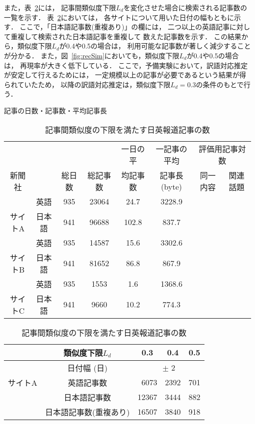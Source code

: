 また，表~\ref{tab:acq_art}には，
記事間類似度下限$L_d$を変化させた場合に検索される記事数の一覧を示す．
表~\ref{tab:acq_art}においては，
各サイトについて用いた日付の幅もともに示す．
ここで，「日本語記事数(重複あり)」の欄には，
二つ以上の英語記事に対して重複して検索された日本語記事を重複して
数えた記事数を示す．
この結果から，類似度下限$L_d$が0.4や0.5の場合は，
利用可能な記事数が著しく減少することが分かる．
また，図~\ref{fig:recSim}においても，類似度下限$L_d$が0.4や0.5の場合は，
再現率が大きく低下している．
ここで，予備実験において，訳語対応推定が安定して行えるためには，
一定規模以上の記事が必要であるという結果が得られていたため，
以降の訳語対応推定は，類似度下限$L_d=0.3$の条件のもとで行う．

\begin{table}
\begin{center}
 \caption{記事の日数・記事数・平均記事長}
 \label{tab:01}
  \newcommand{\lw}[1]{}
{
  \begin{tabular}{|c|c||c|c|c|c|c|c|}
   \hline
          &   &        &          & 一日の平 & 一記事の平均 
             &  \multicolumn{2}{|c|}{評価用記事対数} \\ \cline{7-8}
   新聞社 &   & 総日数 & 総記事数 & 均記事数 & 記事長(byte) &
                     同一内容 & 関連話題 \\ \hline\hline
          &   英語   & 935 & 23064 & 24.7 & 3228.9 & \lw{28} & \lw{31} \\ \cline{2-6} 
サイトA      &   日本語 & 941 & 96688 & 102.8 & 837.7 & & \\ \hline
          &   英語   & 935 & 14587 & 15.6 & 3302.6  & \lw{28} & \lw{82} \\ \cline{2-6} 
サイトB      &   日本語 & 941 & 81652 & 86.8 & 867.9 & & \\ \hline
          &   英語   & 935 & 1553  & 1.6 & 1368.6 & \lw{24} & \lw{33} \\ \cline{2-6} 
サイトC       &   日本語 & 941 & 9660  & 10.2 & 774.3 & & \\ \hline
  \end{tabular}
}
\vspace*{.5cm}

 \caption{記事間類似度の下限を満たす日英報道記事の数}
 \label{tab:acq_art}
{
   \begin{tabular}{|c|c||r|r|r|}                      \hline
   & \multicolumn{1}{|c||}{類似度下限$L_d$} 
           &  \multicolumn{1}{|c|}{0.3} & \multicolumn{1}{|c|}{0.4} 
    & \multicolumn{1}{|c|}{0.5}  \\ \hline\hline
   & \multicolumn{1}{|c||}{日付幅 (日)} 
    &\multicolumn{3}{|c|}{$\pm$ 2} \\ \cline{2-5}
   サイトA&    英語記事数 & 6073 &  2392 & 701 \\ \cline{2-5}
   &   日本語記事数 &  12367  & 3444 & 882 \\ \cline{2-2}\cline{3-5}
   &   日本語記事数(重複あり) & 16507  & 3840 & 918 \\ \hline
    \hline


\end{tabular}}
\end{center}
\end{table}
